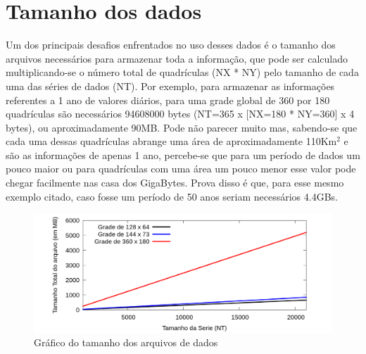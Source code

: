 \section{Tamanho dos dados}

Um dos principais desafios enfrentados no uso desses dados é o tamanho dos arquivos necessários para armazenar toda a informação, que pode ser calculado multiplicando-se o número total de quadrículas (NX * NY) pelo tamanho de cada uma das séries de dados (NT). Por exemplo, para armazenar as informações referentes a 1 ano de valores diários, para uma grade global de 360 por 180 quadrículas são necessários 94608000 bytes (NT=365 x [NX=180 * NY=360] x 4 bytes), ou aproximadamente 90MB. Pode não parecer muito mas, sabendo-se que cada uma dessas quadrículas abrange uma área de aproximadamente 110Km$^2$ e são as informações de apenas 1 ano, percebe-se que para um período de dados um pouco maior ou para quadrículas com uma área um pouco menor esse valor pode chegar facilmente nas casa dos GigaBytes. Prova disso é que, para esse mesmo exemplo citado, caso fosse um período de 50 anos seriam necessários 4.4GBs.

\begin{figure}[H]
\centering
\includegraphics[width=1.0\textwidth]{Imagens/tamanho_dados/serie_tam_dados.png}
\caption{Gráfico do tamanho dos arquivos de dados}
\label{fig:grafico_tamanho_dados}
\end{figure}

